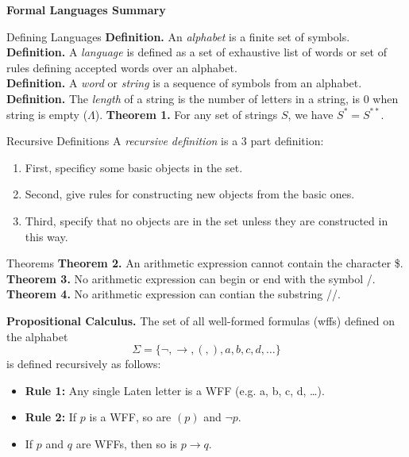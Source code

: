 \documentclass{article}
\title{}
\begin{document}
\begin{center}{\large{\textbf{Formal Languages Summary}}}\\
\end{center}




\begin{multicols*}{3}

\begin{blackbox}{Defining Languages}
    \textbf{Definition.} An \emph{alphabet} is a finite set of symbols.\\
    \textbf{Definition.} A \emph{language} is defined as a set of exhaustive list of words or set of rules defining accepted words over an alphabet.\\
    \textbf{Definition.} A \emph{word} or \emph{string} is a sequence of symbols from an alphabet.\\
    \textbf{Definition.} The \emph{length} of a string is the number of letters in a string, is 0 when string is empty ($\Lambda$).
    \textbf{Theorem 1.} For any set of strings $S$, we have $S^* = S^{**}$.
\end{blackbox}
\begin{blackbox}{Recursive Definitions}
    A \emph{recursive definition} is a 3 part definition:
    \begin{enumerate}[leftmargin=0.5cm]
        \item First, specificy some basic objects in the set.
        \item Second, give rules for constructing new objects from the basic ones.
        \item Third, specify that no objects are in the set unless they are constructed in this way.
    \end{enumerate}
    \begin{bluebox}{Theorems}
        \textbf{Theorem 2.} An arithmetic expression cannot contain the character \$.\\
        \textbf{Theorem 3.} No arithmetic expression can begin or end with the symbol /.\\
        \textbf{Theorem 4.} No arithmetic expression can contian the substring //.
    \end{bluebox}
    \textbf{Propositional Calculus.} The set of all well-formed formulas (wffs) defined on the alphabet \\[-1ex]
    \[\Sigma = \{\neg, \rightarrow, (, ), a,b,c,d,\ldots\}\]
    is defined recursively as follows:
    \begin{itemize}[leftmargin=0.5cm]
        \item \textbf{Rule 1:} Any single Laten letter is a WFF (e.g. a, b, c, d, \ldots).
        \item \textbf{Rule 2:} If $p$ is a WFF, so are $(p)$ and $\neg p$.
        \item If $p$ and $q$ are WFFs, then so is $p\rightarrow q$.
    \end{itemize}
\end{blackbox}


\end{multicols*}
\end{document}
